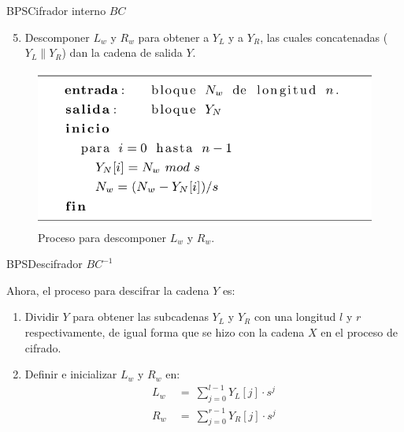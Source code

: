 \begin{frame}{BPS}{Cifrador interno $BC$}

  \begin{enumerate}
    \setcounter{enumi}{4}
    \item Descomponer $L_w$ y $R_w$ para obtener a $Y_L$ y a $Y_R$, las 
      cuales concatenadas ($Y_L \parallel Y_R$) dan la cadena de salida $Y$.
  \end{enumerate}

    \begin{figure}[H]
      \begin{center}
        \includegraphics[width=0.75\linewidth]{diagramas/descomposicion}
        \caption{Proceso para descomponer $L_w$ y $R_w$.}
       \end{center}
    \end{figure}


\end{frame}

\begin{frame}{BPS}{Descifrador $BC^{-1}$}

  Ahora, el proceso para descifrar la cadena $Y$ es:

  \begin{enumerate}
    \item Dividir $Y$ para obtener las subcadenas $Y_L$ y $Y_R$ con una 
      longitud $l$ y $r$ respectivamente, de igual forma que se hizo con 
      la cadena $X$ en el proceso de cifrado.    

    \item Definir e inicializar $L_w$ y $R_w$ en:
      \begin{align}
        L_w\: &=\: \sum_{j=0}^{l-1} Y_L[j] \cdot s^j \\
        R_w\: &=\: \sum_{j=0}^{r-1} Y_R[j] \cdot s^j
      \end{align}
  \end{enumerate}
\end{frame}

